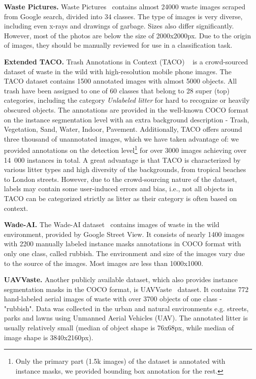 \documentclass{article}
\begin{document}
\textbf{Waste Pictures.} Waste Pictures~\cite{waste_pictures2019} contains almost 24000 waste images scraped from Google search, divided into 34 classes.  The type of images is very diverse, including even x-rays and drawings of garbage. Sizes also differ significantly. However, most of the photos are below the size of 2000x2000px. Due to the origin of images, they should be manually reviewed for use in a classification task.

\textbf{Extended TACO.} Trash Annotations in Context (TACO) ~\cite{proencca2020taco} is a crowd-sourced dataset of waste in the wild with high-resolution mobile phone images. The TACO dataset contains 1500 annotated images with almost 5000 objects. All trash have been assigned to one of 60 classes that belong to 28 super (top) categories, including the category \textit{Unlabeled litter} for hard to recognize or heavily obscured objects. The annotations are provided in the well-known COCO format~\cite{bib:COCO2014} on the instance segmentation level with an extra background description - Trash, Vegetation, Sand, Water, Indoor, Pavement. Additionally, TACO offers around three thousand of unannotated images, which we have taken advantage of: we provided annotations on the detection level\footnote{Only the primary part (1.5k images) of the dataset is annotated with instance masks, we provided bounding box annotation for the rest.} for over 3000 images achieving over 14~000 instances in total. A great advantage is that TACO is characterized by various litter types and high diversity of the backgrounds, from tropical beaches to London streets. However, due to the crowd-sourcing nature of the dataset, labels may contain some user-induced errors and bias, i.e., not all objects in TACO can be categorized strictly as litter as their category is often based on context.

\textbf{Wade-AI.} The Wade-AI dataset~\cite{wade-ai2016} contains images of waste in the wild environment, provided by Google Street View. It consists of nearly 1400 images with 2200 manually labeled instance masks annotations in COCO format with only one class, called rubbish. The environment and size of the images vary due to the source of the images. Most images are less than 1000x1000.

\textbf{UAVVaste.} Another  publicly available dataset, which also provides instance segmentation masks in the COCO format, is UAVVaste~\cite{UAVVaste2021} dataset. It contains 772 hand-labeled aerial images of waste with over 3700 objects of one class - "rubbish". Data was collected in the urban and natural environments e.g. streets, parks and lawns using Unmanned Aerial Vehicles (UAV). The annotated litter is usually relatively small (median of object shape is 76x68px, while median of image shape is 3840x2160px).
\end{document}

